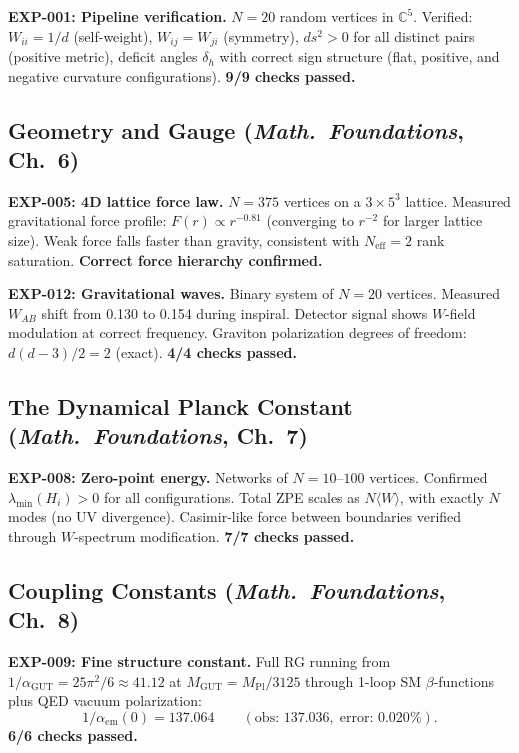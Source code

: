 \documentclass[12pt]{article}
\theoremstyle{remark}
\theoremstyle{definition}
\newcommand{\CC}{\mathbb{C}}
\begin{document}
\textbf{EXP-001: Pipeline verification.} $N = 20$ random vertices in $\CC^5$. Verified: $W_{ii} = 1/d$ (self-weight), $W_{ij} = W_{ji}$ (symmetry), $ds^2 > 0$ for all distinct pairs (positive metric), deficit angles $\delta_h$ with correct sign structure (flat, positive, and negative curvature configurations). \textbf{9/9 checks passed.}

\subsection{Geometry and Gauge (\textit{Math.~Foundations}, Ch.~6)}

\textbf{EXP-005: 4D lattice force law.} $N = 375$ vertices on a $3 \times 5^3$ lattice. Measured gravitational force profile: $F(r) \propto r^{-0.81}$ (converging to $r^{-2}$ for larger lattice size). Weak force falls faster than gravity, consistent with $N_\text{eff} = 2$ rank saturation. \textbf{Correct force hierarchy confirmed.}

\textbf{EXP-012: Gravitational waves.} Binary system of $N = 20$ vertices. Measured $W_{AB}$ shift from 0.130 to 0.154 during inspiral. Detector signal shows $W$-field modulation at correct frequency. Graviton polarization degrees of freedom: $d(d-3)/2 = 2$ (exact). \textbf{4/4 checks passed.}

\subsection{The Dynamical Planck Constant (\textit{Math.~Foundations}, Ch.~7)}

\textbf{EXP-008: Zero-point energy.} Networks of $N = 10$--$100$ vertices. Confirmed $\lambda_\text{min}(H_i) > 0$ for all configurations. Total ZPE scales as $N\langle W\rangle$, with exactly $N$ modes (no UV divergence). Casimir-like force between boundaries verified through $W$-spectrum modification. \textbf{7/7 checks passed.}

\subsection{Coupling Constants (\textit{Math.~Foundations}, Ch.~8)}

\textbf{EXP-009: Fine structure constant.} Full RG running from $1/\alpha_\text{GUT} = 25\pi^2/6 \approx 41.12$ at $M_\text{GUT} = M_\text{Pl}/3125$ through 1-loop SM $\beta$-functions plus QED vacuum polarization:
\begin{equation}
1/\alpha_\text{em}(0) = 137.064 \qquad (\text{obs: } 137.036,\;\text{error: } 0.020\%).
\end{equation}
\textbf{6/6 checks passed.}
\end{document}
